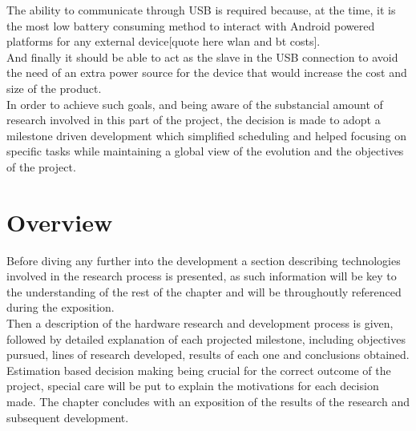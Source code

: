 	The ability to communicate through USB is required because, at the time, it is the most low battery consuming method to interact with Android powered platforms for any external device[quote here wlan and bt costs].\\

	And finally it should be able to act as the slave in the USB connection to avoid the need of an extra power source for the device that would increase the cost and size of the product.\\


	In order to achieve such goals, and being aware of the substancial amount of research involved in this part of the project, the decision is made to adopt a milestone driven development which simplified scheduling and helped focusing on specific tasks while maintaining a global view of the evolution and the objectives of the project.\\

	\section{Overview}
	\label{sec:hw-oview}

	Before diving any further into the development a section describing technologies involved in the research process is presented, as such information will be key to the understanding of the rest of the chapter and will be throughoutly referenced during the exposition.\\

	Then a description of the hardware research and development process is given, followed by detailed explanation of each projected milestone, including objectives pursued, lines of research developed, results of each one and conclusions obtained. Estimation based decision making being crucial for the correct outcome of the project, special care will be put to explain the motivations for each decision made. The chapter concludes with an exposition of the results of the research and subsequent development.

